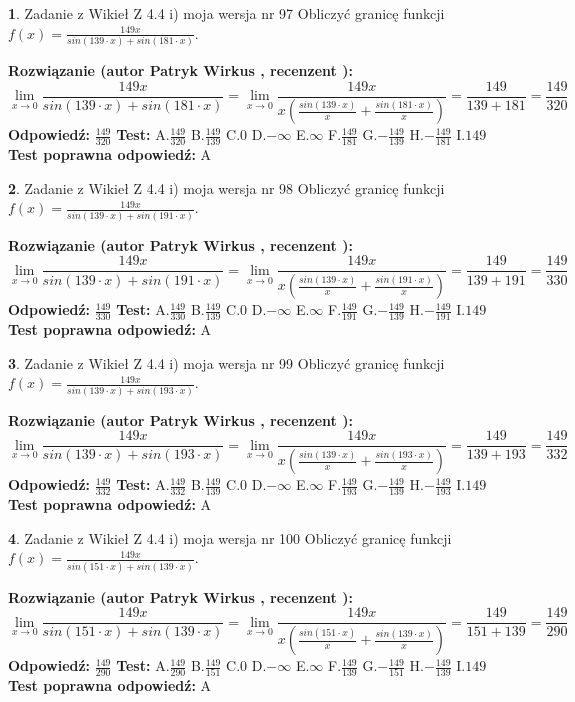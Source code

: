 \documentclass[12pt, a4paper]{article}
\theoremstyle{definition} %
\newtheorem{zad}{}
\newcommand{\zadStart}[1]{\begin{zad}#1\newline}
\newcommand{\zadStop}{\end{zad}}
\newcommand{\rozwStart}[2]{\noindent \textbf{Rozwiązanie (autor #1 , recenzent #2): }\newline}
\newcommand{\rozwStop}{\newline}
\newcommand{\odpStart}{\noindent \textbf{Odpowiedź:}\newline}
\newcommand{\odpStop}{\newline}
\newcommand{\testStart}{\noindent \textbf{Test:}\newline}
\newcommand{\testStop}{\newline}
\newcommand{\kluczStart}{\noindent \textbf{Test poprawna odpowiedź:}\newline}
\newcommand{\kluczStop}{\newline}
\begin{document}
\zadStart{Zadanie z Wikieł Z 4.4 i) moja wersja nr 97}
Obliczyć granicę funkcji $f(x)=\frac{149x}{sin(139\cdot x) +sin(181\cdot x)}$.
\zadStop
\rozwStart{Patryk Wirkus}{}
$$\lim\limits_{x\to 0}\frac{149x}{sin(139\cdot x) +sin(181\cdot x)}=\lim\limits_{x\to 0}\frac{149x}{x(\frac{sin(139\cdot x)}{x}+\frac{sin(181\cdot x)}{x})}=\frac{149}{139+181} = \frac{149}{320}$$
\rozwStop
\odpStart
$\frac{149}{320}$
\odpStop
\testStart
A.$\frac{149}{320}$
B.$\frac{149}{139}$
C.$0$
D.$-\infty$
E.$\infty$
F.$\frac{149}{181}$
G.$-\frac{149}{139}$
H.$-\frac{149}{181}$
I.$149$
\testStop
\kluczStart
A
\kluczStop



\zadStart{Zadanie z Wikieł Z 4.4 i) moja wersja nr 98}
Obliczyć granicę funkcji $f(x)=\frac{149x}{sin(139\cdot x) +sin(191\cdot x)}$.
\zadStop
\rozwStart{Patryk Wirkus}{}
$$\lim\limits_{x\to 0}\frac{149x}{sin(139\cdot x) +sin(191\cdot x)}=\lim\limits_{x\to 0}\frac{149x}{x(\frac{sin(139\cdot x)}{x}+\frac{sin(191\cdot x)}{x})}=\frac{149}{139+191} = \frac{149}{330}$$
\rozwStop
\odpStart
$\frac{149}{330}$
\odpStop
\testStart
A.$\frac{149}{330}$
B.$\frac{149}{139}$
C.$0$
D.$-\infty$
E.$\infty$
F.$\frac{149}{191}$
G.$-\frac{149}{139}$
H.$-\frac{149}{191}$
I.$149$
\testStop
\kluczStart
A
\kluczStop



\zadStart{Zadanie z Wikieł Z 4.4 i) moja wersja nr 99}
Obliczyć granicę funkcji $f(x)=\frac{149x}{sin(139\cdot x) +sin(193\cdot x)}$.
\zadStop
\rozwStart{Patryk Wirkus}{}
$$\lim\limits_{x\to 0}\frac{149x}{sin(139\cdot x) +sin(193\cdot x)}=\lim\limits_{x\to 0}\frac{149x}{x(\frac{sin(139\cdot x)}{x}+\frac{sin(193\cdot x)}{x})}=\frac{149}{139+193} = \frac{149}{332}$$
\rozwStop
\odpStart
$\frac{149}{332}$
\odpStop
\testStart
A.$\frac{149}{332}$
B.$\frac{149}{139}$
C.$0$
D.$-\infty$
E.$\infty$
F.$\frac{149}{193}$
G.$-\frac{149}{139}$
H.$-\frac{149}{193}$
I.$149$
\testStop
\kluczStart
A
\kluczStop



\zadStart{Zadanie z Wikieł Z 4.4 i) moja wersja nr 100}
Obliczyć granicę funkcji $f(x)=\frac{149x}{sin(151\cdot x) +sin(139\cdot x)}$.
\zadStop
\rozwStart{Patryk Wirkus}{}
$$\lim\limits_{x\to 0}\frac{149x}{sin(151\cdot x) +sin(139\cdot x)}=\lim\limits_{x\to 0}\frac{149x}{x(\frac{sin(151\cdot x)}{x}+\frac{sin(139\cdot x)}{x})}=\frac{149}{151+139} = \frac{149}{290}$$
\rozwStop
\odpStart
$\frac{149}{290}$
\odpStop
\testStart
A.$\frac{149}{290}$
B.$\frac{149}{151}$
C.$0$
D.$-\infty$
E.$\infty$
F.$\frac{149}{139}$
G.$-\frac{149}{151}$
H.$-\frac{149}{139}$
I.$149$
\testStop
\kluczStart
A
\kluczStop
\end{document}
